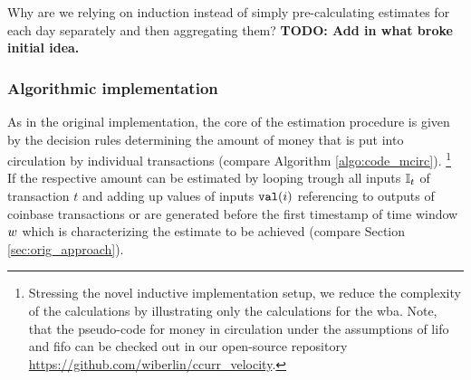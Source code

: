 Why are we relying on induction instead of simply pre-calculating estimates for each day separately and then aggregating them? %
\textbf{TODO: Add in what broke initial idea.}


\subsubsection{Algorithmic implementation}
\label{sec:novel_impl_algo}%

As in the original implementation, the core of the estimation procedure is given by the decision rules determining the amount of money that is put into circulation by individual transactions (compare Algorithm \ref{algo:code_mcirc}).%
\footnote{Stressing the novel inductive implementation setup, we reduce the complexity of the calculations by illustrating only the calculations for the \ac{wba}. %
Note, that the pseudo-code for money in circulation under the assumptions of \ac{lifo} and \ac{fifo} can be checked out in our open-source repository \url{https://github.com/wiberlin/ccurr_velocity}.
}
If the respective amount can be estimated by looping trough all inputs \({\mathbb{I}}_{t}\) of transaction \(t\) and adding up values of inputs \({\mathtt{val}}(i)\) referencing to outputs of coinbase transactions or are generated before the first timestamp of time window \({w}\) which is characterizing the estimate to be achieved (compare Section \ref{sec:orig_approach}). %



